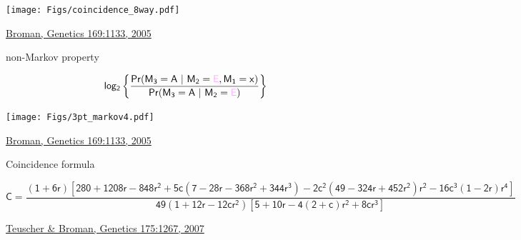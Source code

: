 \documentclass[12pt]{article}
\newcommand{\citesize}{\fontsize{14}{18} \selectfont}
\newcommand{\headsize}{\fontsize{35}{35} \selectfont}
\newcommand{\smallsize}{\fontsize{25}{30} \selectfont}
\newcommand{\supersmall}{\fontsize{16}{18} \selectfont}
\begin{document}
{\centerline{\texttt{[image: Figs/coincidence\_8way.pdf]}}

\vfill

\hfill {\citesize \color{citecolor} \href{http://www.genetics.org/content/169/2/1133.full}{Broman, Genetics
169:1133, 2005}}

\vspace*{5mm}

\newpage


\headsize \color{myyellow}
\hfill \begin{minipage}{5.75in}
\centering
{\color{mypink} non-}Markov property
\end{minipage}

\vspace{15mm}

\color{myblue} \smallsize
$$ \mathsf{log_2 \left\{ \frac{
    Pr(M_3 = A \ | \ M_2 = {\color{mypink} E}, M_1 = x)}{
    Pr(M_3 = A \ | \ M_2 = {\color{mypink} E})}\right\}}$$

\centerline{\texttt{[image: Figs/3pt\_markov4.pdf]}}

\vfill

\hfill {\citesize \color{citecolor} \href{http://www.genetics.org/content/169/2/1133.full}{Broman, Genetics
169:1133, 2005}}

\vspace*{5mm}

\newpage


\headsize \color{myyellow}
\hfill \begin{minipage}{5.75in}
\centering
Coincidence formula
\end{minipage}

\vspace{5cm}

\supersmall \color{mywhite}

$$ \mathsf{C = \frac{(1+6r)[280 + 1208r - 848r^2 + 5c(7-28r - 368r^2 + 344r^3)
  - 2c^2(49 - 324r + 452r^2)r^2 - 16c^3(1-2r)r^4]}{49 (1+12r-12cr^2)
    [5+10r-4(2+c)r^2+8cr^3]} }$$

\vfill

\hfill {\citesize \color{citecolor} \href{http://www.genetics.org/content/175/3/1267.full}{Teuscher \& Broman, Genetics
175:1267, 2007}}

\vspace*{5mm}

}
\end{document}

